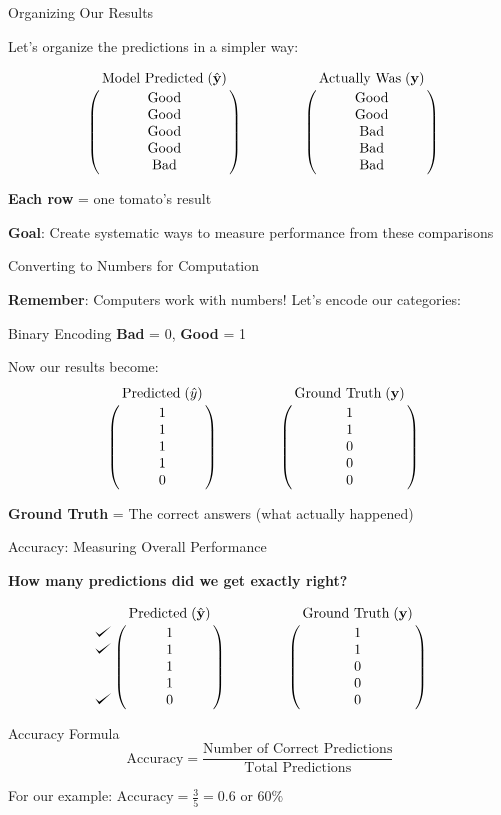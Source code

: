 \documentclass[usenames,dvipsnames]{beamer}
\begin{document}
\begin{frame}{Organizing Our Results}

Let's organize the predictions in a simpler way:

$$\bordermatrix{&\text{Model Predicted}\;(\yhat)\cr
                &\text{Good}\cr
                &\text{Good}\cr
                &\text{Good}\cr
                &\text{Good}\cr
                &\text{Bad}}
                \qquad \qquad
   \bordermatrix{&\text{Actually Was}\;(\vy)\cr
                &\text{Good}\cr
                &\text{Good}\cr
                &\text{Bad}\cr
                &\text{Bad}\cr
                &\text{Bad}}
$$

\pause \textbf{Each row} = one tomato's result

\textbf{Goal}: Create systematic ways to measure performance from these comparisons
\end{frame}

\begin{frame}{Converting to Numbers for Computation}

\textbf{Remember}: Computers work with numbers! Let's encode our categories:

\begin{examplebox}{Binary Encoding}
\textbf{Bad} = 0, \textbf{Good} = 1
\end{examplebox}

\vspace{-5pt}
Now our results become:
$$\bordermatrix{&\text{Predicted}\;(\hat{y})\cr
                &1\cr
                &1\cr
                &1\cr
                &1\cr
                &0}
                \qquad \qquad
   \bordermatrix{&\text{Ground Truth}\;(\vy)\cr
                &1\cr
                &1\cr
                &0\cr
                &0\cr
                &0}
$$

\textbf{Ground Truth} = The correct answers (what actually happened)
\end{frame}

\begin{frame}{Accuracy: Measuring Overall Performance}

\textbf{How many predictions did we get exactly right?}

$$
\bordermatrix{&\text{Predicted}\;(\yhat)\cr
               \checkmark&1\cr
               \checkmark&1\cr
                &1\cr
                &1\cr
               \checkmark&0}
\qquad \qquad
\bordermatrix{&\text{Ground Truth}\;(\vy)\cr
                &1\cr
                &1\cr
                &0\cr
                &0\cr
                &0}
$$

\pause
\begin{definitionbox}{Accuracy Formula}
$$\text{Accuracy} = \frac{\text{Number of Correct Predictions}}{\text{Total Predictions}}$$
\end{definitionbox}

\pause For our example: $\text{Accuracy} = \frac{3}{5} = 0.6$ or $60\%$

\end{frame}
\end{document}
